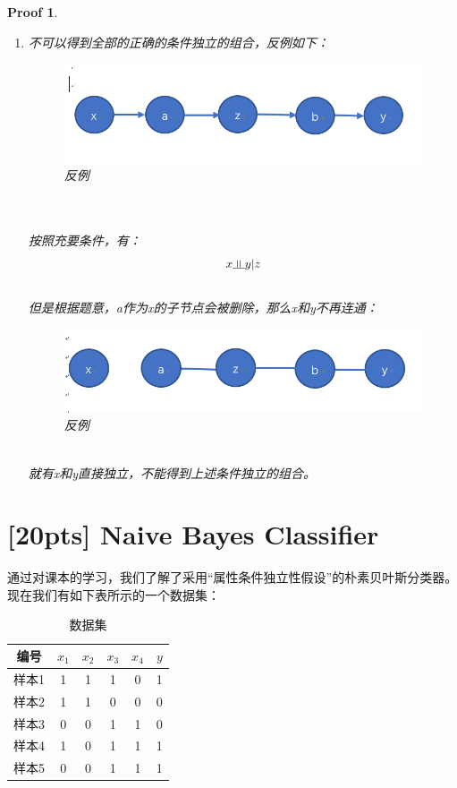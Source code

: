 \documentclass[a4paper,UTF8]{article}
\numberwithin{equation}{section}
\newtheorem*{myProof}{Proof}
\newcommand{\indep}{\rotatebox[origin=c]{90}{$\models$}}
\begin{document}
\begin{myProof}
\begin{enumerate}[(1)]
\begin{equation}
\begin{aligned}
&B \indep E | A,D
\end{aligned}
\end{equation}
\item 
不可以得到全部的正确的条件独立的组合，反例如下：
\begin{figure}[!ht]
	\centering
	\includegraphics[scale=0.5]{bayes.png}
	\caption{反例}
	\label{fig:label2}
\end{figure}\\\\
按照充要条件，有：
\begin{equation}
x \indep y | z
\end{equation}
\\
但是根据题意，a作为x的子节点会被删除，那么x和y不再连通：\\
\begin{figure}[!ht]
	\centering
	\includegraphics[scale=0.5]{bayes2.png}
	\caption{反例}
	\label{fig:label3}
\end{figure}\\
就有x和y直接独立，不能得到上述条件独立的组合。\\
\end{enumerate}
\end{myProof}
\newpage
\section{[20pts] Naive Bayes Classifier}
	
	通过对课本的学习，我们了解了采用“属性条件独立性假设”的朴素贝叶斯分类器。现在我们有如下表所示的一个数据集：
	\begin{table}[htp]
		\centering
		\caption{数据集}\label{tab:aStrangeTable}
	\begin{tabular}{c|ccccc}
		\hline 
	编号	& $x_1$ & $x_2$ & $x_3$ & $x_4$ & $y$ \\ 
		\hline 
	样本1	& 1 & 1 & 1 & 0 & 1 \\ 
		\hline 
	样本2	& 1 & 1 & 0 & 0 & 0 \\ 
		\hline 
	样本3	& 0 & 0 & 1 & 1 & 0 \\ 
		\hline 
	样本4	& 1 & 0 & 1 & 1 & 1 \\ 
		\hline 
	样本5	& 0 & 0 & 1 & 1 & 1 \\ 
		\hline 
	\end{tabular}
	\end{table} 
	
\end{document}
